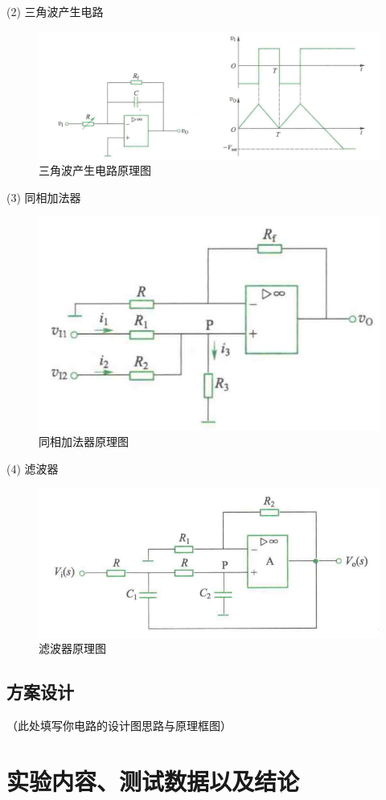 \documentclass[12pt, a4paper]{article}
\begin{document}
(2) 三角波产生电路

\begin{figure}[ht]
    \centering
    \includegraphics[width=0.6\linewidth]{image/3.png}
    \caption{三角波产生电路原理图}
    \label{fig:三角波产生电路原理图}
\end{figure}

(3) 同相加法器

\begin{figure}[ht]
    \centering
    \includegraphics[width=0.6\linewidth]{image/4.png}
    \caption{同相加法器原理图}
    \label{fig:同相加法器原理图}
\end{figure}
\clearpage
(4) 滤波器

\begin{figure}[ht]
    \centering
    \includegraphics[width=0.6\linewidth]{image/5.png}
    \caption{滤波器原理图}
    \label{fig:滤波器原理图}
\end{figure}

\subsection{方案设计}
（此处填写你电路的设计图思路与原理框图）

\clearpage
\section{实验内容、测试数据以及结论}
\end{document}
